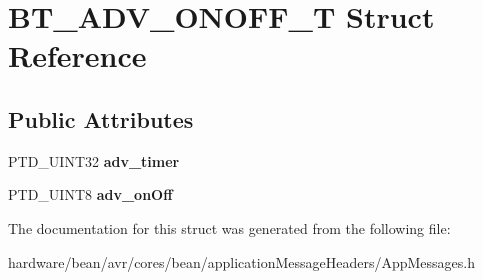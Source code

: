 \hypertarget{struct_b_t___a_d_v___o_n_o_f_f___t}{}\section{B\+T\+\_\+\+A\+D\+V\+\_\+\+O\+N\+O\+F\+F\+\_\+T Struct Reference}
\label{struct_b_t___a_d_v___o_n_o_f_f___t}
\subsection*{Public Attributes}
\begin{DoxyCompactItemize}
\item 
P\+T\+D\+\_\+\+U\+I\+N\+T32 {\bfseries adv\+\_\+timer}\hypertarget{struct_b_t___a_d_v___o_n_o_f_f___t_ae5d71728eac5a5a55cfde06ffbe75f4e}{}\label{struct_b_t___a_d_v___o_n_o_f_f___t_ae5d71728eac5a5a55cfde06ffbe75f4e}

\item 
P\+T\+D\+\_\+\+U\+I\+N\+T8 {\bfseries adv\+\_\+on\+Off}\hypertarget{struct_b_t___a_d_v___o_n_o_f_f___t_aa77a9330146830b6451be534b41ea389}{}\label{struct_b_t___a_d_v___o_n_o_f_f___t_aa77a9330146830b6451be534b41ea389}

\end{DoxyCompactItemize}


The documentation for this struct was generated from the following file\+:\begin{DoxyCompactItemize}
\item 
hardware/bean/avr/cores/bean/application\+Message\+Headers/App\+Messages.\+h\end{DoxyCompactItemize}
